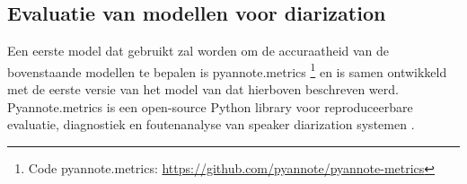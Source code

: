 \begin{comment}
Een tweede model dat gebruikt wordt is diart \footnote{Code diart: \url{https://github.com/juanmc2005/diart}}. Dit model is de officiële implementatie van de resultaten van \textcite{Coria2021} en bestaat uit twee fases. De eerste fase past een end-to-end aanpak toe waarbij audio segmenten gebruikt worden die klein genoeg zijn om een aanvaardbare inschatting te maken van de maximale hoeveelheid sprekers die aanwezig zijn \autocite{Coria2021}. In de tweede fase wordt globale clustering toegepast op het resultaat van de eerste fase \autocite{Coria2021}.
\end{comment}


\subsection{Evaluatie van modellen voor diarization}
Een eerste model dat gebruikt zal worden om de accuraatheid van de bovenstaande modellen te bepalen is pyannote.metrics \footnote{Code pyannote.metrics: \url{https://github.com/pyannote/pyannote-metrics}} en is samen ontwikkeld met de eerste versie van het model van \textcite{Bredin2023} dat hierboven beschreven werd. Pyannote.metrics is een open-source Python library voor reproduceerbare evaluatie, diagnostiek en foutenanalyse van speaker diarization systemen \autocite{Bredin2017}.